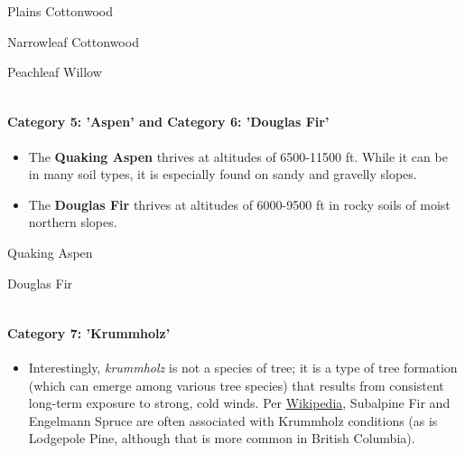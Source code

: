 \documentclass[11pt]{article}
\providecommand{\tightlist}{%
      \setlength{\itemsep}{0pt}\setlength{\parskip}{0pt}}
\begin{document}
Plains Cottonwood

\textbar{}

Narrowleaf Cottonwood

\textbar{}

Peachleaf Willow

\begin{longtable}[]{@{}lll@{}}
\toprule
& &\tabularnewline
\bottomrule
\end{longtable}

    \paragraph{\texorpdfstring{{Category 5}: 'Aspen' and {Category 6}:
'Douglas
Fir'}{Category 5: 'Aspen' and Category 6: 'Douglas Fir'}}\label{category-5-aspen-and-category-6-douglas-fir}

\begin{itemize}
\tightlist
\item
  The \textbf{Quaking Aspen} thrives at altitudes of 6500-11500 ft.
  While it can be in many soil types, it is especially found on sandy
  and gravelly slopes.
\item
  The \textbf{Douglas Fir} thrives at altitudes of 6000-9500 ft in rocky
  soils of moist northern slopes.
\end{itemize}

Quaking Aspen

\textbar{}

Douglas Fir

\begin{longtable}[]{@{}ll@{}}
\toprule
&\tabularnewline
\bottomrule
\end{longtable}

    \paragraph{\texorpdfstring{{Category 7}:
'Krummholz'}{Category 7: 'Krummholz'}}\label{category-7-krummholz}

\begin{itemize}
\tightlist
\item
  Interestingly, \emph{krummholz} is not a species of tree; it is a type
  of tree formation (which can emerge among various tree species) that
  results from consistent long-term exposure to strong, cold winds. Per
  \href{https://en.wikipedia.org/wiki/Krummholz}{Wikipedia}, Subalpine
  Fir and Engelmann Spruce are often associated with Krummholz
  conditions (as is Lodgepole Pine, although that is more common in
  British Columbia).
\end{itemize}
\end{document}
